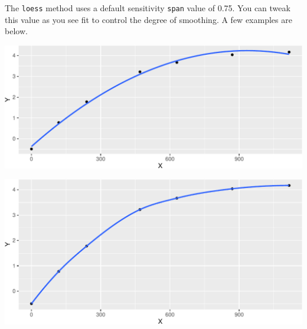 \documentclass[twoside, 12pt]{article}
\newenvironment{Shaded}{\begin{snugshade}}{\end{snugshade}}
\newcommand{\KeywordTok}[1]{\textcolor[rgb]{0.13,0.29,0.53}{\textbf{{#1}}}}
\newcommand{\DataTypeTok}[1]{\textcolor[rgb]{0.13,0.29,0.53}{{#1}}}
\newcommand{\DecValTok}[1]{\textcolor[rgb]{0.00,0.00,0.81}{{#1}}}
\newcommand{\FloatTok}[1]{\textcolor[rgb]{0.00,0.00,0.81}{{#1}}}
\newcommand{\StringTok}[1]{\textcolor[rgb]{0.31,0.60,0.02}{{#1}}}
\newcommand{\OtherTok}[1]{\textcolor[rgb]{0.56,0.35,0.01}{{#1}}}
\newcommand{\NormalTok}[1]{{#1}}
\begin{document}
The \texttt{loess} method uses a default sensitivity \texttt{span} value
of 0.75. You can tweak this value as you see fit to control the degree
of smoothing. A few examples are below.

\begin{Shaded}
\end{Shaded}

\includegraphics{skeleton_files/figure-latex/unnamed-chunk-51-1.pdf}

\begin{Shaded}
\end{Shaded}

\includegraphics{skeleton_files/figure-latex/unnamed-chunk-52-1.pdf}
\end{document}
